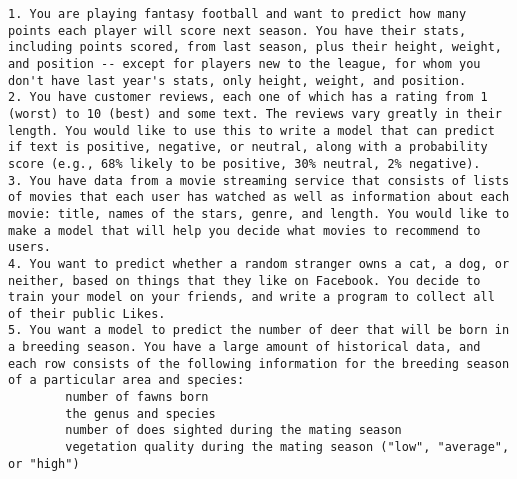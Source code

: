 \documentclass[letterpaper]{article}
\begin{document}
\begin{verbatim}
1. You are playing fantasy football and want to predict how many points each player will score next season. You have their stats, including points scored, from last season, plus their height, weight, and position -- except for players new to the league, for whom you don't have last year's stats, only height, weight, and position.
2. You have customer reviews, each one of which has a rating from 1 (worst) to 10 (best) and some text. The reviews vary greatly in their length. You would like to use this to write a model that can predict if text is positive, negative, or neutral, along with a probability score (e.g., 68% likely to be positive, 30% neutral, 2% negative).
3. You have data from a movie streaming service that consists of lists of movies that each user has watched as well as information about each movie: title, names of the stars, genre, and length. You would like to make a model that will help you decide what movies to recommend to users.
4. You want to predict whether a random stranger owns a cat, a dog, or neither, based on things that they like on Facebook. You decide to train your model on your friends, and write a program to collect all of their public Likes. 
5. You want a model to predict the number of deer that will be born in a breeding season. You have a large amount of historical data, and each row consists of the following information for the breeding season of a particular area and species:
        number of fawns born
        the genus and species
        number of does sighted during the mating season
        vegetation quality during the mating season ("low", "average", or "high")
\end{verbatim}
\end{document}
